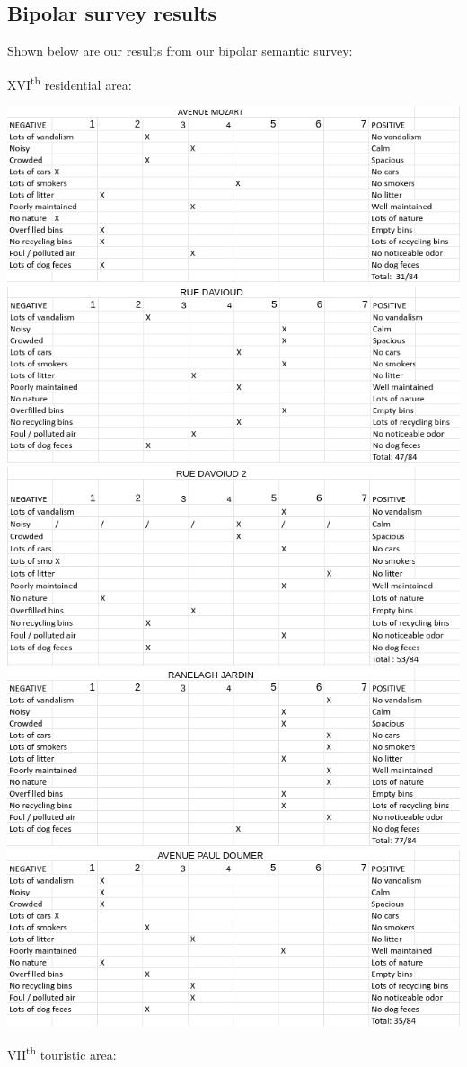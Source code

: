 \documentclass[11pt,letterpaper]{article}
\begin{document}
\subsection{Bipolar survey results}
\label{app:bipolar}

Shown below are our results from our bipolar semantic survey:

XVI\textsuperscript{th} residential area:

\includegraphics[width=0.5\linewidth]{media/bipolar/mozart.png}
\includegraphics[width=0.5\linewidth]{media/bipolar/davioud1.png}
\includegraphics[width=0.5\linewidth]{media/bipolar/davioud2.png}
\includegraphics[width=0.5\linewidth]{media/bipolar/ranelagh.png}
\includegraphics[width=0.5\linewidth]{media/bipolar/pauldoumer.png}

VII\textsuperscript{th} touristic area:
\end{document}
